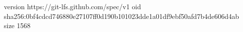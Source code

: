 version https://git-lfs.github.com/spec/v1
oid sha256:0bf4cdcd746880e27107ff0d190b101023dde1a01df9ebf50afd7b4de606d4ab
size 1568
